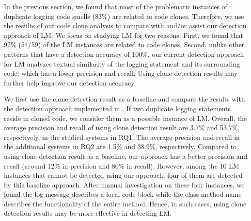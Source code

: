  In the previous section, we found that most of the problematic instances of duplicate logging code smells (83\%) are related to code clones. Therefore, we use the results of our code clone analysis to compare with and/or assist our detection approach of LM. We focus on studying LM for two reasons. First, we found that 92\% (54/59) of the LM instances are related to code clones. Second, unlike other patterns that have a detection accuracy of 100\%, our current detection approach for LM analyzes textual similarity of the logging statement and its surrounding code, which has a lower precision and recall. Using clone detection results may further help improve our detection accuracy. 

\vspace{-0.05cm}
We first use the clone detection result as a baseline and compare the results with the detection approach implemented in \tool. If two duplicate logging statements reside in cloned code, we consider them as a possible instance of LM. Overall, the average precision and recall of using clone detection result are 3.7\% and 53.7\%, respectively, in the studied systems in RQ1. The average precision and recall in the additional systems in RQ2 are 1.5\% and 38.9\%, respectively. Compared to using clone detection result as a baseline, our approach has a better precision and recall (around 12\% in precision and 80\% in recall). However, among the 10 LM instances that cannot be detected using our approach, four of them are detected by this baseline approach. After manual investigation on these four instances, we found the log message describes a local code block while the class-method name describes the functionality of the entire method. Hence, in such cases, using clone detection results may be more effective in detecting LM. 


